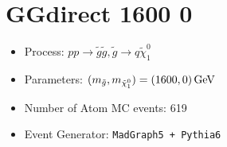 \documentclass[12pt]{article}
\begin{document}
\section{GGdirect 1600 0 }

\begin{itemize}
\item  Process:  $pp \to \tilde g \tilde g, \tilde g \to q \tilde \chi_1^0$

\item  Parameters:  $(m_{\tilde g}, m_{\tilde \chi_1^0}) = (1600, 0) \,{\rm GeV}$

\item  Number of Atom MC events:  619

\item  Event Generator: { \tt  MadGraph5 + Pythia6
 }
\end{itemize}
\end{document}
